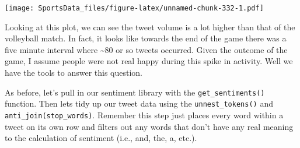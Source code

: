 \documentclass[
]{book}
\newenvironment{Shaded}{\begin{snugshade}}{\end{snugshade}}
\newcommand{\DataTypeTok}[1]{\textcolor[rgb]{0.13,0.29,0.53}{#1}}
\newcommand{\KeywordTok}[1]{\textcolor[rgb]{0.13,0.29,0.53}{\textbf{#1}}}
\newcommand{\NormalTok}[1]{#1}
\newcommand{\OperatorTok}[1]{\textcolor[rgb]{0.81,0.36,0.00}{\textbf{#1}}}
\newcommand{\StringTok}[1]{\textcolor[rgb]{0.31,0.60,0.02}{#1}}
\begin{document}
\begin{Shaded}
\end{Shaded}

\texttt{[image: SportsData\_files/figure-latex/unnamed-chunk-332-1.pdf]}

Looking at this plot, we can see the tweet volume is a lot higher than that of the volleyball match. In fact, it looks like towards the end of the game there was a five minute interval where \textasciitilde80 or so tweets occurred. Given the outcome of the game, I assume people were not real happy during this spike in activity. Well we have the tools to answer this question.

As before, let's pull in our sentiment library with the \texttt{get\_sentiments()} function. Then lets tidy up our tweet data using the \texttt{unnest\_tokens()} and \texttt{anti\_join(stop\_words)}. Remember this step just places every word within a tweet on its own row and filters out any words that don't have any real meaning to the calculation of sentiment (i.e., and, the, a, etc.).

\begin{Shaded}
\end{Shaded}
\end{document}
